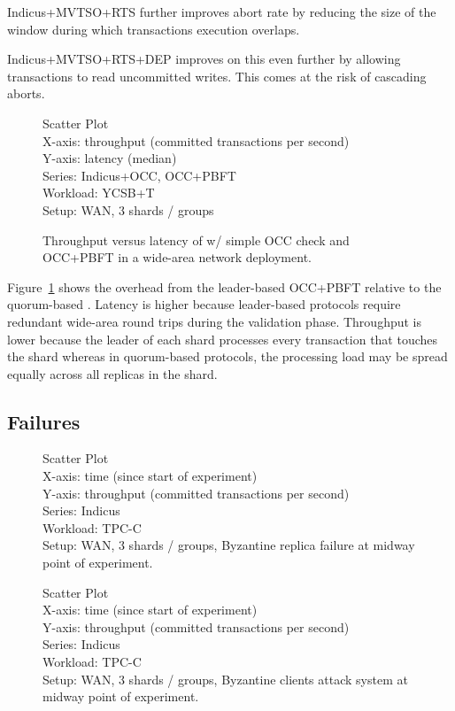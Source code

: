 Indicus+MVTSO+RTS further improves abort rate by reducing the size of the window
during which transactions execution overlaps. 

Indicus+MVTSO+RTS+DEP improves on this even further by allowing transactions to
read uncommitted writes. This comes at the risk of cascading aborts.

\begin{figure}
  Scatter Plot\\
  X-axis: throughput (committed transactions per second)\\
  Y-axis: latency (median)\\
  Series: Indicus+OCC, OCC+PBFT\\
  Workload: YCSB+T\\
  Setup: WAN, 3 shards / groups\\
  \caption{Throughput versus latency of \sys{} w/ simple OCC check and
  OCC+PBFT in a wide-area network deployment.}
  \label{fig:to-vs-po-tput-lat}
\end{figure}

Figure~\ref{fig:to-vs-po-tput-lat} shows the overhead from the leader-based
OCC+PBFT relative to the quorum-based \sys{}. Latency is higher because leader-based
protocols require redundant wide-area round trips during the validation phase.
Throughput is lower because the leader of each shard processes every transaction
that touches the shard whereas in quorum-based protocols, the processing load 
may be spread equally across all replicas in the shard.

\subsection{Failures}

\begin{figure}
  Scatter Plot\\
  X-axis: time (since start of experiment)\\
  Y-axis: throughput (committed transactions per second)\\
  Series: Indicus\\
  Workload: TPC-C\\
  Setup: WAN, 3 shards / groups, Byzantine replica failure at midway point of
  experiment.\\
\end{figure}

\begin{figure}
  Scatter Plot\\
  X-axis: time (since start of experiment)\\
  Y-axis: throughput (committed transactions per second)\\
  Series: Indicus\\
  Workload: TPC-C\\
  Setup: WAN, 3 shards / groups, Byzantine clients attack system at midway point
  of experiment.\\
\end{figure}

